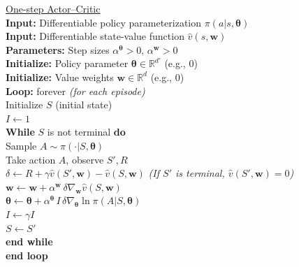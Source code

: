 \documentclass{article}
\begin{document}
\begin{tcolorbox}[arc=0mm,width=(\linewidth - 0.2cm)] 
	\begin{tabbing}
		{\sc \underline{One-step Actor–Critic}}\\
    \textbf{Input:} Differentiable policy parameterization $\pi(a | s,\bm{\theta})$ \\
    \textbf{Input:} Differentiable state-value function $\hat v(s,\bm{w})$ \\
    \textbf{Parameters:} Step sizes $\alpha^{\bm{\theta}} > 0$, $\alpha^{\bm{w}} > 0$ \\
        \textbf{Initialize:} Policy parameter $\bm{\theta} \in \mathbb{R}^{d'}$ (e.g., $0$) \\
        \textbf{Initialize:} Value weights $\bm{w} \in \mathbb{R}^d$ (e.g., $0$) \\
        \textbf{Loop:} forever \textit{(for each episode)} \\
        \hspace{0.5cm} Initialize $S$ (initial state) \\
        \hspace{0.5cm} $I \gets 1$ \\
        \hspace{0.5cm} \textbf{While} $S$ is not terminal \textbf{do} \\
        \hspace{1.0cm} Sample $A \sim \pi(\cdot | S,\bm{\theta})$ \\
        \hspace{1.0cm} Take action $A$, observe $S', R$ \\
        \hspace{1.0cm} $\delta \gets R + \gamma \hat v(S',\bm{w}) - \hat v(S,\bm{w})$ 
        \hspace{1.5cm} \textit{(If $S'$ is terminal, $\hat v(S',\bm{w}) = 0$)} \\
        \hspace{1.0cm} $\bm{w} \gets \bm{w} + \alpha^{\bm{w}} \, \delta \nabla_{\bm{w}} \hat v(S,\bm{w})$ \\
        \hspace{1.0cm} $\bm{\theta} \gets \bm{\theta} + \alpha^{\bm{\theta}} \, I \, \delta \nabla_{\bm{\theta}} \ln \pi(A | S,\bm{\theta})$ \\
        \hspace{1.0cm} $I \gets \gamma I$ \\
        \hspace{1.0cm} $S \gets S'$ \\
        \hspace{0.5cm} \textbf{end while} \\
        \textbf{end loop} \\
	\end{tabbing}
\end{tcolorbox}
\end{document}
